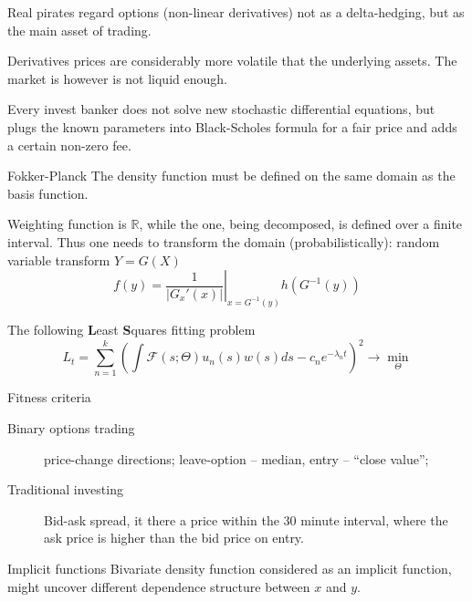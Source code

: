 \documentclass[a4paper]{article}
\newcommand{\brac}[1]{{\left ( #1 \right )}}
\newcommand{\induc}[1]{{\left . #1 \right \vert}}
\newcommand{\abs}[1]{{\left | #1 \right |}}
\newcommand{\Real}{\mathbb{R}}
\newcommand{\Fcal}{\mathcal{F}}
\begin{document}

Real pirates regard options (non-linear derivatives) not as a delta-hedging, but as the main asset of trading.

Derivatives prices are considerably more volatile that the underlying assets. The market is however is not liquid enough.

Every invest banker does not solve new stochastic differential equations, but plugs the known parameters into Black-Scholes formula for a fair price and adds a certain non-zero fee.

Fokker-Planck
The density function must be defined on the same domain as the basis function.

Weighting function is $\Real$, while the one, being decomposed, is defined over a finite interval. Thus one needs to transform the domain (probabilistically): random variable transform $Y=G(X)$
\[f(y) = \induc{ \frac{1}{ \abs{G_x'(x)}} }_{x=G^{-1}(y) } h\brac{G^{-1}(y)}\]


The following \textbf{L}east \textbf{S}quares fitting problem
\[L_t = \sum_{n=1}^k \brac{ \int \Fcal(s;\Theta) u_n(s) w(s) ds - c_n e^{-\lambda_n t} }^2 \to \min_\Theta\]


Fitness criteria \begin{description}
	\item[Binary options trading] price-change directions; leave-option -- median, entry -- ``close value'';
	\item[Traditional investing] Bid-ask spread, it there a price within the 30 minute interval, where the ask price is higher than the bid price on entry.
\end{description}



Implicit functions 
Bivariate density function considered as an implicit function, might uncover different dependence structure between $x$ and $y$.
\end{document}
